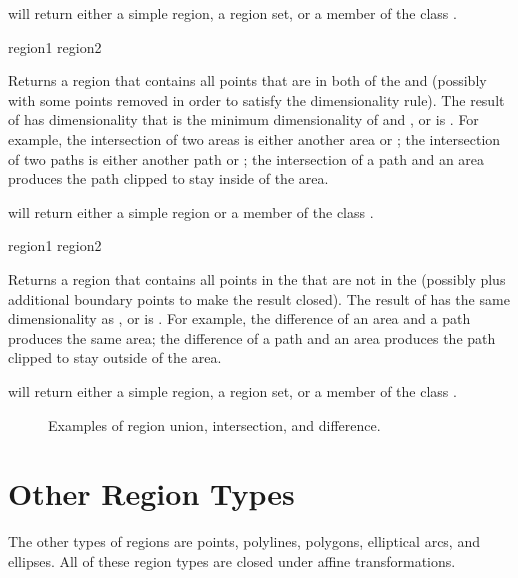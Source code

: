  will return either a simple region, a region set, or a member
of the class .

\MayCaptureInputs

 {region1 region2}

Returns a region that contains all points that are in both of the 
 and  (possibly with some points removed in order to
satisfy the dimensionality rule).  The result of  has
dimensionality that is the minimum dimensionality of  and
, or is .  For example, the intersection of two areas
is either another area or ; the intersection of two paths is
either another path or ; the intersection of a path and an area
produces the path clipped to stay inside of the area.

 will return either a simple region or a member of the
class .

\MayCaptureInputs

 {region1 region2}

Returns a region that contains all points in the  
that are not in the   (possibly plus additional
boundary points to make the result closed).  The result of
 has the same dimensionality as , or is
.  For example, the difference of an area and a path produces the
same area; the difference of a path and an area produces the path clipped to
stay outside of the area.

 will return either a simple region, a region set, or a
member of the class .

\MayCaptureInputs


\begin{figure}
\ifpsfig\centerline{}\else\vspace{2.0in}\fi
\caption{Examples of region union, intersection, and difference.}
\end{figure}


\section {Other Region Types}

The other types of regions are points, polylines, polygons, elliptical arcs, and
ellipses.  All of these region types are closed under affine transformations.

